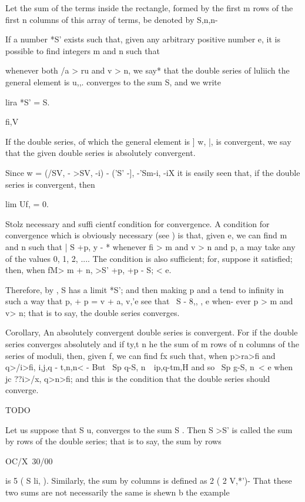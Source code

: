 %
%

Let the sum of the terms inside the rectangle, formed by the first m
rows of the first n columns of this array of terms, be denoted by
S,n,n-

If a number *S' exists such that, given any arbitrary positive number
e, it is possible to find integers m and n such that

whenever both /a > ru and v > n, we say* that the double series of
luliich the general element is u,,. converges to the sum S, and we
write

lira *S' = S.

 fi,V

If the double series, of which the general element is ] w, |, is
convergent, we say that the given double series is absolutely
convergent.

Since w = (/SV, - >SV, -i) - ('S' -], -'Sm-i, -iX it is easily seen
that, if the double series is convergent, then

lim Uf, = 0.

Stolz necessary and suffi cientf condition for convergence. A
condition for convergence which is obviously necessary (see ) is
that, given e, we can find m and n such that | S +p, y - *%
whenever fi > m and v > n and p, a may take any of the values 0, 1, 2,
.... The condition is also sufficient; for, suppose it satisfied;
then, when fM> m + n, >S' +p, +p - S; < e.

Therefore, by , S has a limit *S'; and then making p and a tend
to infinity in such a way that p, + p = v + a, v,'e see that \ S - 8,,
, e when- ever p > m and v> n; that is to say, the double series
converges.

Corollary, An absolutely convergent double series is convergent. For
if the double series converges absolutely and if ty,t n he the sum of
m rows of n columns of the series of moduli, then, given f, we can
find fx such that, when p>ra>fi and q>/i>fi, i,j,q - t,n,n< - But \ Sp
q-S, n\ \ ip,q-tm,H and so \ Sp g-S, n\ < e when jc ??i>/x, q>n>fi;
and this is the condition that the double series should converge.

TODO

Let us suppose that S u, converges to the sum S . Then S >S' is
called the sum by rows of the double series; that is to say, the sum
by rows

OC/X\ 30/00\

is 5 ( S li, ). Similarly, the sum by columns is defined as 2 ( 2
V,*')- That these two sums are not necessarily the same is shewn b the
example

